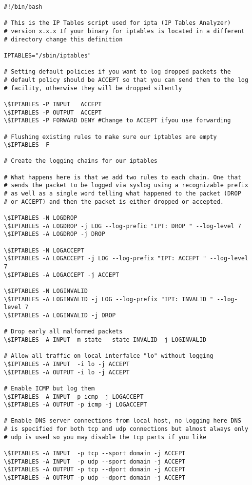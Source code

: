 \documentclass[english,twoside,openright,a4paper,12pt]{article}
\begin{document}
\scriptsize \begin{verbatim}
#!/bin/bash

# This is the IP Tables script used for ipta (IP Tables Analyzer)
# version x.x.x If your binary for iptables is located in a different
# directory change this definition

IPTABLES="/sbin/iptables"

# Setting default policies if you want to log dropped packets the
# default policy should be ACCEPT so that you can send them to the log
# facility, otherwise they will be dropped silently

\$IPTABLES -P INPUT   ACCEPT
\$IPTABLES -P OUTPUT  ACCEPT
\$IPTABLES -P FORWARD DENY #Change to ACCEPT ifyou use forwarding

# Flushing existing rules to make sure our iptables are empty 
\$IPTABLES -F

# Create the logging chains for our iptables

# What happens here is that we add two rules to each chain. One that
# sends the packet to be logged via syslog using a recognizable prefix
# as well as a single word telling what happened to the packet (DROP
# or ACCEPT) and then the packet is either dropped or accepted.

\$IPTABLES -N LOGDROP
\$IPTABLES -A LOGDROP -j LOG --log-prefic "IPT: DROP " --log-level 7
\$IPTABLES -A LOGDROP -j DROP

\$IPTABLES -N LOGACCEPT
\$IPTABLES -A LOGACCEPT -j LOG --log-prefix "IPT: ACCEPT " --log-level 7 
\$IPTABLES -A LOGACCEPT -j ACCEPT

\$IPTABLES -N LOGINVALID
\$IPTABLES -A LOGINVALID -j LOG --log-prefix "IPT: INVALID " --log-level 7 
\$IPTABLES -A LOGINVALID -j DROP

# Drop early all malformed packets
\$IPTABLES -A INPUT -m state --state INVALID -j LOGINVALID

# Allow all traffic on local interfalce "lo" without logging 
\$IPTABLES -A INPUT  -i lo -j ACCEPT
\$IPTABLES -A OUTPUT -i lo -j ACCEPT

# Enable ICMP but log them
\$IPTABLES -A INPUT -p icmp -j LOGACCEPT 
\$IPTABLES -A OUTPUT -p icmp -j LOGACCEPT

# Enable DNS server connections from local host, no logging here DNS
# is specified for both tcp and udp connections but almost always only
# udp is used so you may disable the tcp parts if you like

\$IPTABLES -A INPUT  -p tcp --sport domain -j ACCEPT
\$IPTABLES -A INPUT  -p udp --sport domain -j ACCEPT
\$IPTABLES -A OUTPUT -p tcp --dport domain -j ACCEPT
\$IPTABLES -A OUTPUT -p udp --dport domain -j ACCEPT


\end{verbatim}
\end{document}
